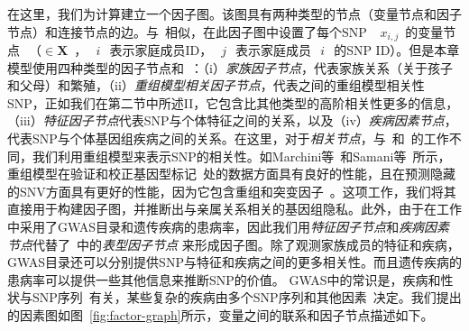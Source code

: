 在这里，我们为计算建立一个因子图。该图具有两种类型的节点（变量节点和因子节点）和连接节点的边。与~\cite{humbert2013addressing,humbert2017quantifying,deznabi2018inference}相似，在此因子图中设置了每个SNP ~$~x_{i,j}$~的变量节点~$~（\in \mathbf{X}$~，~$~i~$~表示家庭成员ID，~$~j~$~表示家庭成员~$~i~$~的SNP ID）。但是本章模型使用四种类型的因子节点和~\cite{deznabi2018inference}：（i）\emph{家族因子节点}，代表家族关系（关于孩子和父母）和繁殖，（ii）\emph{重组模型相关因子节点}，代表之间的重组模型相关性SNP，正如我们在第二节中所述II，它包含比其他类型的高阶相关性更多的信息，（iii）\emph{特征因子节点}代表SNP与个体特征之间的关系，以及（iv）\emph{疾病因素节点}，代表SNP与个体基因组疾病之间的关系。在这里，对于\emph{相关节点}，与~\cite{humbert2013addressing}和~\cite{deznabi2018inference}的工作不同，我们利用重组模型来表示SNP的相关性。如Marchini等~\cite{marchini2007newa}和Samani等~\cite{samani2015quantifying}所示，重组模型在验证和校正基因型标记~\cite{marchini2007newa}处的数据方面具有良好的性能，且在预测隐藏的SNV方面具有更好的性能，因为它包含重组和突变因子~\cite{samani2015quantifying}。这项工作，我们将其直接用于构建因子图，并推断出与亲属关系相关的基因组隐私。此外，由于在工作中采用了GWAS目录和遗传疾病的患病率，因此我们用\emph{特征因子节点}和\emph{疾病因素节点}代替了~\cite{deznabi2018inference}中的\emph{表型因子节点} 来形成因子图。除了观测家族成员的特征和疾病，GWAS目录还可以分别提供SNP与特征和疾病之间的更多相关性。而且遗传疾病的患病率可以提供一些其他信息来推断SNP的价值。 GWAS中的常识是，疾病和性状与SNP序列~\cite{manolio2008a}有关，某些复杂的疾病由多个SNP序列和其他因素~\cite{climer2014a}决定。我们提出的因素图如图~\ref{fig:factor-graph}所示，变量之间的联系和因子节点描述如下。

